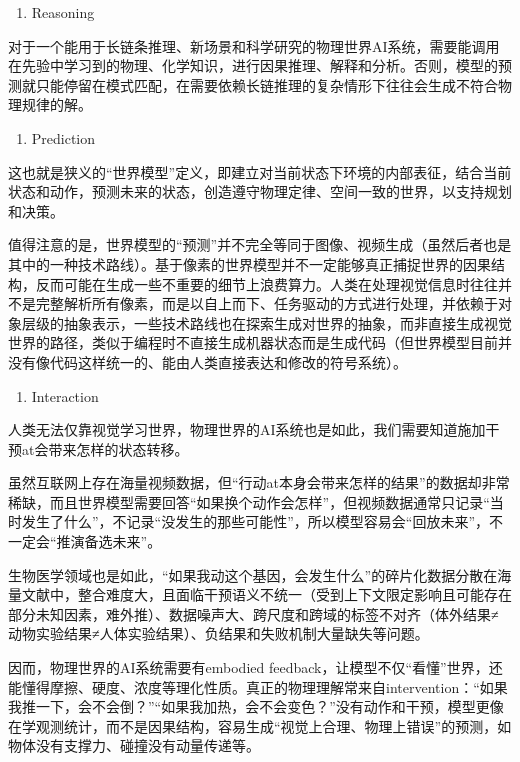 \begin{enumerate}
\def\labelenumi{\arabic{enumi}.}
\setcounter{enumi}{1}
\tightlist
\item
  Reasoning
\end{enumerate}

对于一个能用于长链条推理、新场景和科学研究的物理世界AI系统，需要能调用在先验中学习到的物理、化学知识，进行因果推理、解释和分析。否则，模型的预测就只能停留在模式匹配，在需要依赖长链推理的复杂情形下往往会生成不符合物理规律的解。

\begin{enumerate}
\def\labelenumi{\arabic{enumi}.}
\setcounter{enumi}{2}
\tightlist
\item
  Prediction
\end{enumerate}

这也就是狭义的``世界模型''定义，即建立对当前状态下环境的内部表征，结合当前状态和动作，预测未来的状态，创造遵守物理定律、空间一致的世界，以支持规划和决策。

值得注意的是，世界模型的``预测''并不完全等同于图像、视频生成（虽然后者也是其中的一种技术路线）。基于像素的世界模型并不一定能够真正捕捉世界的因果结构，反而可能在生成一些不重要的细节上浪费算力。人类在处理视觉信息时往往并不是完整解析所有像素，而是以自上而下、任务驱动的方式进行处理，并依赖于对象层级的抽象表示，一些技术路线也在探索生成对世界的抽象，而非直接生成视觉世界的路径，类似于编程时不直接生成机器状态而是生成代码（但世界模型目前并没有像代码这样统一的、能由人类直接表达和修改的符号系统）。

\begin{enumerate}
\def\labelenumi{\arabic{enumi}.}
\setcounter{enumi}{3}
\tightlist
\item
  Interaction
\end{enumerate}

人类无法仅靠视觉学习世界，物理世界的AI系统也是如此，我们需要知道施加干预at会带来怎样的状态转移。

虽然互联网上存在海量视频数据，但``行动at本身会带来怎样的结果''的数据却非常稀缺，而且世界模型需要回答``如果换个动作会怎样''，但视频数据通常只记录``当时发生了什么''，不记录``没发生的那些可能性''，所以模型容易会``回放未来''，不一定会``推演备选未来''。

生物医学领域也是如此，``如果我动这个基因，会发生什么''的碎片化数据分散在海量文献中，整合难度大，且面临干预语义不统一（受到上下文限定影响且可能存在部分未知因素，难外推）、数据噪声大、跨尺度和跨域的标签不对齐（体外结果≠动物实验结果≠人体实验结果）、负结果和失败机制大量缺失等问题。

因而，物理世界的AI系统需要有embodied feedback，让模型不仅``看懂''世界，还能懂得摩擦、硬度、浓度等理化性质。真正的物理理解常来自intervention：``如果我推一下，会不会倒？''``如果我加热，会不会变色？''没有动作和干预，模型更像在学观测统计，而不是因果结构，容易生成``视觉上合理、物理上错误''的预测，如物体没有支撑力、碰撞没有动量传递等。

